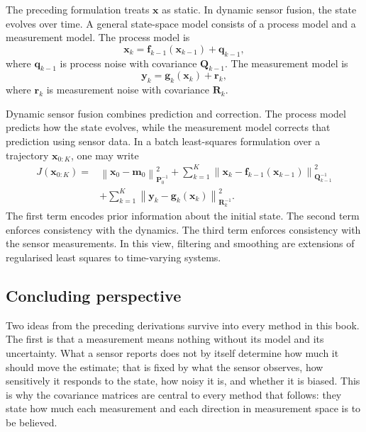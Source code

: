 The preceding formulation treats $\mathbf{x}$ as static. In dynamic sensor fusion, the state evolves over time. A general state-space model consists of a process model and a measurement model. The process model is
\begin{equation}
\mathbf{x}_k
=
\mathbf{f}_{k-1}
\left(
\mathbf{x}_{k-1}
\right)
+
\mathbf{q}_{k-1},
\end{equation}
where $\mathbf{q}_{k-1}$ is process noise with covariance $\mathbf{Q}_{k-1}$. The measurement model is
\begin{equation}
\mathbf{y}_k
=
\mathbf{g}_k
\left(
\mathbf{x}_k
\right)
+
\mathbf{r}_k,
\end{equation}
where $\mathbf{r}_k$ is measurement noise with covariance $\mathbf{R}_k$.

Dynamic sensor fusion combines prediction and correction. The process model predicts how the state evolves, while the measurement model corrects that prediction using sensor data. In a batch least-squares formulation over a trajectory $\mathbf{x}_{0:K}$, one may write
\begin{align}
J(\mathbf{x}_{0:K})
=&
\left\|
\mathbf{x}_0
-
\mathbf{m}_0
\right\|_{\mathbf{P}_0^{-1}}^2
+
\sum_{k=1}^{K}
\left\|
\mathbf{x}_k
-
\mathbf{f}_{k-1}
\left(
\mathbf{x}_{k-1}
\right)
\right\|_{\mathbf{Q}_{k-1}^{-1}}^2 \nonumber \\
&+
\sum_{k=1}^{K}
\left\|
\mathbf{y}_k
-
\mathbf{g}_k
\left(
\mathbf{x}_k
\right)
\right\|_{\mathbf{R}_k^{-1}}^2.
\end{align}
The first term encodes prior information about the initial state. The second term enforces consistency with the dynamics. The third term enforces consistency with the sensor measurements. In this view, filtering and smoothing are extensions of regularised least squares to time-varying systems.



\subsection{Concluding perspective}

Two ideas from the preceding derivations survive into every method in this book. The first is that a measurement means nothing without its model and its uncertainty. What a sensor reports does not by itself determine how much it should move the estimate; that is fixed by what the sensor observes, how sensitively it responds to the state, how noisy it is, and whether it is biased. This is why the covariance matrices are central to every method that follows: they state how much each measurement and each direction in measurement space is to be believed.

